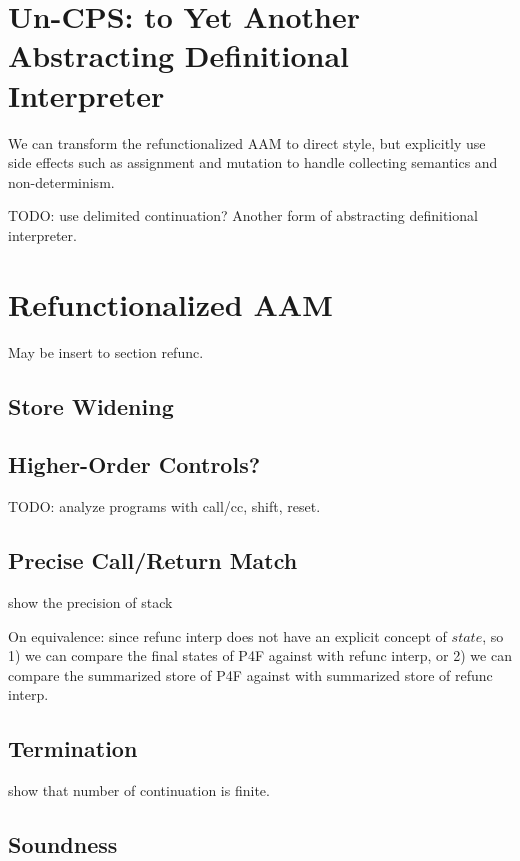 \documentclass[acmsmall,review,anonymous]{acmart}\settopmatter{printfolios=true,printccs=false,printacmref=false}
\begin{document}
\section{Un-CPS: to Yet Another Abstracting Definitional Interpreter}

We can transform the refunctionalized AAM to direct style, but explicitly use 
side effects such as assignment and mutation to handle collecting semantics and non-determinism.

TODO: use delimited continuation? 
Another form of abstracting definitional interpreter.

\section{Refunctionalized AAM}

May be insert to section refunc.

\subsection{Store Widening}

\subsection{Higher-Order Controls?}

TODO: analyze programs with call/cc, shift, reset.

\subsection{Precise Call/Return Match}

show the precision of stack

On equivalence: since refunc interp does not have an explicit concept of $state$,
so 1) we can compare the final states of P4F against with refunc interp,
or 2) we can compare the summarized store of P4F against with summarized store of refunc interp.

\subsection{Termination}

show that number of continuation is finite.

\subsection{Soundness}
\end{document}
